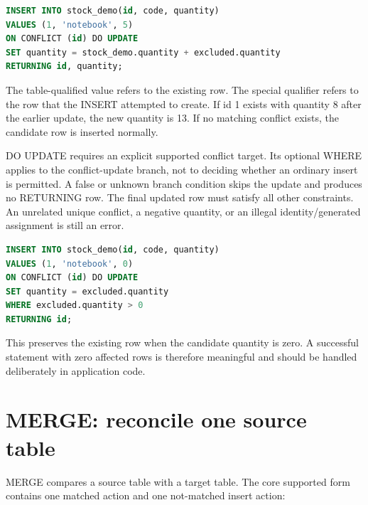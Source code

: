 \begin{lstlisting}[language=SQL]
INSERT INTO stock_demo(id, code, quantity)
VALUES (1, 'notebook', 5)
ON CONFLICT (id) DO UPDATE
SET quantity = stock_demo.quantity + excluded.quantity
RETURNING id, quantity;
\end{lstlisting}

The table-qualified value refers to the existing row. The special  qualifier refers to the row that the INSERT attempted to create. If id 1 exists with quantity 8 after the earlier update, the new quantity is 13. If no matching conflict exists, the candidate row is inserted normally.

DO UPDATE requires an explicit supported conflict target. Its optional WHERE applies to the conflict-update branch, not to deciding whether an ordinary insert is permitted. A false or unknown branch condition skips the update and produces no RETURNING row. The final updated row must satisfy all other constraints. An unrelated unique conflict, a negative quantity, or an illegal identity/generated assignment is still an error.

\begin{lstlisting}[language=SQL]
INSERT INTO stock_demo(id, code, quantity)
VALUES (1, 'notebook', 0)
ON CONFLICT (id) DO UPDATE
SET quantity = excluded.quantity
WHERE excluded.quantity > 0
RETURNING id;
\end{lstlisting}

This preserves the existing row when the candidate quantity is zero. A successful statement with zero affected rows is therefore meaningful and should be handled deliberately in application code.


\section{MERGE: reconcile one source table}

MERGE compares a source table with a target table. The core supported form contains one matched action and one not-matched insert action:

